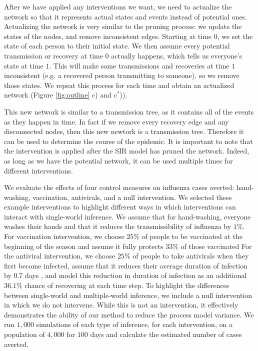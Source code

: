 \documentclass[PTRSB]{rsos}
\begin{document}
\begin{multicols}{2}
After we have applied any interventions we want, we need to actualize the network so that it represents actual states and events instead of potential ones.
Actualizing the network is very similar to the pruning process: we update the states of the nodes, and remove inconsistent edges.
Starting at time $0$, we set the state of each person to their initial state.
We then assume every potential transmission or recovery at time $0$ actually happens, which tells us everyone's state at time $1$.
This will make some transmissions and recoveries at time $1$ inconsistent (e.g. a recovered person transmitting to someone), so we remove those states.
We repeat this process for each time and obtain an actualized network (Figure \ref{fig:outline} c) and c${}^*$)).

This new network is similar to a transmission tree, as it contains all of the events as they happen in time.
In fact if we remove every recovery edge and any disconnected nodes, then this new newtork is a transmission tree.
Therefore it can be used to determine the course of the epidemic.
It is important to note that the intervention is applied after the SIR model has pruned the network.
Indeed, as long as we have the potential network, it can be used multiple times for different interventions.

We evaluate the effects of four control measures on influenza cases averted: hand-washing, vaccination, antivirals, and a null intervention.
We selected these example interventions to highlight different ways in which interventions can interact with single-world inference.
We assume that for hand-washing, everyone washes their hands and that it reduces the transmissibility of influenza by $1\%$.
For vaccination intervention, we choose $25\%$ of people to be vaccinated at the beginning of the season and assume it fully protects $33\%$ of those vaccinated
For the antiviral intervention, we choose $25\%$ of people to take antivirals when they first become infected, assume that it reduces their average duration of infection by $0.7$ days \cite{oseltamivir:2014}, and model this reduction in duration of infection as an additional $36.1\%$ chance of recovering at each time step.
To highlight the differences between single-world and multiple-world inference, we include a null intervention in which we do not intervene.
While this is not an intervention, it effectively demonstrates the ability of our method to reduce the process model variance.
We run $1,000$ simulations of each type of inference, for each intervention, on a population of $4,000$ for $100$ days and calculate the estimated number of cases averted.


\end{multicols}
\end{document}
